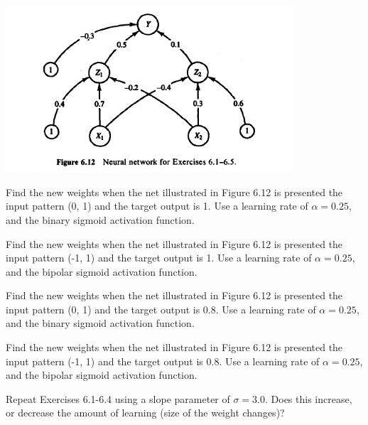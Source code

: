 \begin{center}
\includegraphics[width=0.8\textwidth]{img/figure6-12.png}
\end{center}

\begin{problem}[1]
Find the new weights when the net illustrated in Figure 6.12 is presented the input pattern (0, 1) and the target output is 1. Use a learning rate of $α = 0.25$, and the binary sigmoid activation function.

\solution
\end{problem}

\begin{problem}[2]
Find the new weights when the net illustrated in Figure 6.12 is presented the input pattern (-1, 1) and the target output is 1. Use a learning rate of $α = 0.25$, and the bipolar sigmoid activation function.

\solution
\end{problem}

\begin{problem}[3]
Find the new weights when the net illustrated in Figure 6.12 is presented the input pattern (0, 1) and the target output is 0.8. Use a learning rate of $α = 0.25$, and the binary sigmoid activation function.

\solution
\end{problem}

\begin{problem}[4]
Find the new weights when the net illustrated in Figure 6.12 is presented the input pattern (-1, 1) and the target output is 0.8. Use a learning rate of $α = 0.25$, and the bipolar sigmoid activation function.

\solution
\end{problem}

\begin{problem}[5]
Repeat Exercises 6.1-6.4 using a slope parameter of $σ = 3.0$. Does this increase, or decrease the amount of learning (size of the weight changes)?

\solution
\end{problem}

